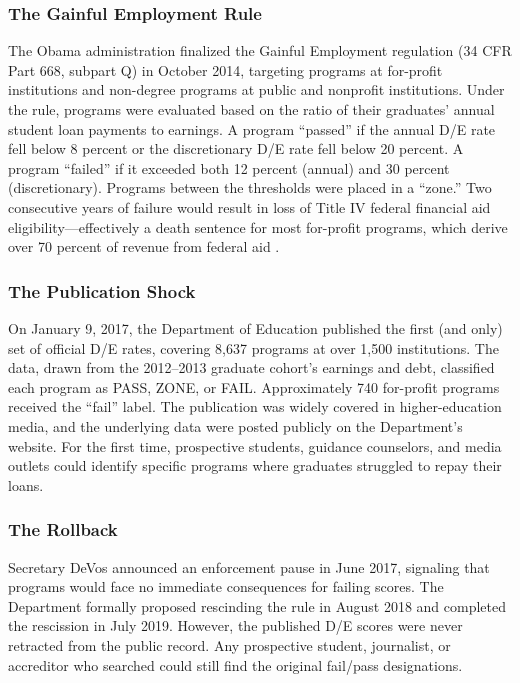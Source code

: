 \documentclass[12pt]{article}
\begin{document}
\subsubsection*{The Gainful Employment Rule} The Obama administration finalized the Gainful Employment regulation (34 CFR Part 668, subpart Q) in October 2014, targeting programs at for-profit institutions and non-degree programs at public and nonprofit institutions. Under the rule, programs were evaluated based on the ratio of their graduates' annual student loan payments to earnings. A program ``passed'' if the annual D/E rate fell below 8 percent or the discretionary D/E rate fell below 20 percent. A program ``failed'' if it exceeded both 12 percent (annual) and 30 percent (discretionary). Programs between the thresholds were placed in a ``zone.'' Two consecutive years of failure would result in loss of Title IV federal financial aid eligibility---effectively a death sentence for most for-profit programs, which derive over 70 percent of revenue from federal aid \citep{deming2012for}.

\subsubsection*{The Publication Shock} On January 9, 2017, the Department of Education published the first (and only) set of official D/E rates, covering 8,637 programs at over 1,500 institutions. The data, drawn from the 2012--2013 graduate cohort's earnings and debt, classified each program as PASS, ZONE, or FAIL. Approximately 740 for-profit programs received the ``fail'' label. The publication was widely covered in higher-education media, and the underlying data were posted publicly on the Department's website. For the first time, prospective students, guidance counselors, and media outlets could identify specific programs where graduates struggled to repay their loans.

\subsubsection*{The Rollback} Secretary DeVos announced an enforcement pause in June 2017, signaling that programs would face no immediate consequences for failing scores. The Department formally proposed rescinding the rule in August 2018 and completed the rescission in July 2019. However, the published D/E scores were never retracted from the public record. Any prospective student, journalist, or accreditor who searched could still find the original fail/pass designations.
\end{document}
